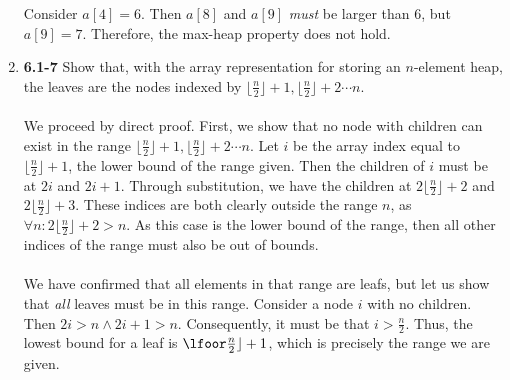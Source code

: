 \documentclass{article}
\begin{document}
\begin{enumerate}
	\\\\ Consider $a[4]=6$. Then $a[8]$ and $a[9]$ \emph{must} be larger than $6$, but $a[9]=7$. Therefore, the max-heap property does not hold. 
	\item \textbf{6.1-7} Show that, with the array representation for storing an $n$-element heap, the leaves are the nodes indexed by $\lfloor \frac{n}{2} \rfloor + 1, \lfloor \frac{n}{2} \rfloor + 2 \cdots n $.
	\\\\ We proceed by direct proof. First, we show that no node with children can exist in the range $\lfloor \frac{n}{2} \rfloor + 1, \lfloor \frac{n}{2} \rfloor + 2 \cdots n $. Let $i$ be the array index equal to $\lfloor \frac{n}{2} \rfloor + 1$, the lower bound of the range given. Then the children of $i$ must be at $2i$ and $2i+1$. Through substitution, we have the children at $2\lfloor \frac{n}{2} \rfloor + 2$ and $2\lfloor \frac{n}{2} \rfloor + 3$. These indices are both clearly outside the range $n$, as $\forall n: 2 \lfloor \frac{n}{2} \rfloor + 2 > n$. As this case is the lower bound of the range, then all other indices of the range must also be out of bounds.
	\\\\ We have confirmed that all elements in that range are leafs, but let us show that \emph{all} leaves must be in this range. Consider a node $i$ with no children. Then $2i > n \land 2i+1 > n$. Consequently, it must be that $i>\frac{n}{2}$. Thus, the lowest bound for a leaf is $\lfoor \frac{n}{2} \rfloor + 1$, which is precisely the range we are given.
\end{enumerate}
\end{document}
